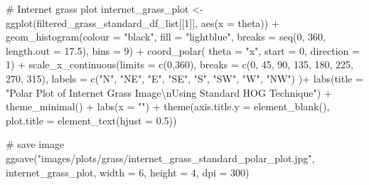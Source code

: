 \documentclass[
  letterpaper,
  DIV=11,
  numbers=noendperiod]{scrreprt}
\newenvironment{Shaded}{\begin{snugshade}}{\end{snugshade}}
\newcommand{\AttributeTok}[1]{\textcolor[rgb]{0.40,0.45,0.13}{#1}}
\newcommand{\CommentTok}[1]{\textcolor[rgb]{0.37,0.37,0.37}{#1}}
\newcommand{\DecValTok}[1]{\textcolor[rgb]{0.68,0.00,0.00}{#1}}
\newcommand{\FloatTok}[1]{\textcolor[rgb]{0.68,0.00,0.00}{#1}}
\newcommand{\FunctionTok}[1]{\textcolor[rgb]{0.28,0.35,0.67}{#1}}
\newcommand{\NormalTok}[1]{\textcolor[rgb]{0.00,0.23,0.31}{#1}}
\newcommand{\OtherTok}[1]{\textcolor[rgb]{0.00,0.23,0.31}{#1}}
\newcommand{\SpecialCharTok}[1]{\textcolor[rgb]{0.37,0.37,0.37}{#1}}
\newcommand{\StringTok}[1]{\textcolor[rgb]{0.13,0.47,0.30}{#1}}
\begin{document}
\begin{Shaded}
\begin{Highlighting}[]
\CommentTok{\# Internet grass plot}
\NormalTok{internet\_grass\_plot }\OtherTok{\textless{}{-}}
  \FunctionTok{ggplot}\NormalTok{(filtered\_grass\_standard\_df\_list[[}\DecValTok{1}\NormalTok{]], }
         \FunctionTok{aes}\NormalTok{(}\AttributeTok{x =}\NormalTok{ theta)) }\SpecialCharTok{+}
  \FunctionTok{geom\_histogram}\NormalTok{(}\AttributeTok{colour =} \StringTok{"black"}\NormalTok{, }
                 \AttributeTok{fill =} \StringTok{"lightblue"}\NormalTok{, }
                 \AttributeTok{breaks =} \FunctionTok{seq}\NormalTok{(}\DecValTok{0}\NormalTok{, }\DecValTok{360}\NormalTok{, }\AttributeTok{length.out =} \FloatTok{17.5}\NormalTok{),}
                 \AttributeTok{bins =} \DecValTok{9}\NormalTok{) }\SpecialCharTok{+}
  \FunctionTok{coord\_polar}\NormalTok{(}
    \AttributeTok{theta =} \StringTok{"x"}\NormalTok{, }
    \AttributeTok{start =} \DecValTok{0}\NormalTok{, }
    \AttributeTok{direction =} \DecValTok{1}\NormalTok{) }\SpecialCharTok{+}
  \FunctionTok{scale\_x\_continuous}\NormalTok{(}\AttributeTok{limits =} \FunctionTok{c}\NormalTok{(}\DecValTok{0}\NormalTok{,}\DecValTok{360}\NormalTok{),}
    \AttributeTok{breaks =} \FunctionTok{c}\NormalTok{(}\DecValTok{0}\NormalTok{, }\DecValTok{45}\NormalTok{, }\DecValTok{90}\NormalTok{, }\DecValTok{135}\NormalTok{, }\DecValTok{180}\NormalTok{, }\DecValTok{225}\NormalTok{, }\DecValTok{270}\NormalTok{, }\DecValTok{315}\NormalTok{), }
    \AttributeTok{labels =} \FunctionTok{c}\NormalTok{(}\StringTok{"N"}\NormalTok{, }\StringTok{"NE"}\NormalTok{, }\StringTok{"E"}\NormalTok{, }\StringTok{"SE"}\NormalTok{, }\StringTok{"S"}\NormalTok{, }\StringTok{"SW"}\NormalTok{, }\StringTok{"W"}\NormalTok{, }\StringTok{"NW"}\NormalTok{)}
\NormalTok{  )}\SpecialCharTok{+}
  \FunctionTok{labs}\NormalTok{(}\AttributeTok{title =} \StringTok{"Polar Plot of Internet Grass Image}\SpecialCharTok{\textbackslash{}n}\StringTok{Using Standard HOG Technique"}\NormalTok{) }\SpecialCharTok{+}
  \FunctionTok{theme\_minimal}\NormalTok{() }\SpecialCharTok{+}
  \FunctionTok{labs}\NormalTok{(}\AttributeTok{x =} \StringTok{""}\NormalTok{) }\SpecialCharTok{+}
  \FunctionTok{theme}\NormalTok{(}\AttributeTok{axis.title.y =} \FunctionTok{element\_blank}\NormalTok{(),}
        \AttributeTok{plot.title =} \FunctionTok{element\_text}\NormalTok{(}\AttributeTok{hjust =} \FloatTok{0.5}\NormalTok{))}

\CommentTok{\# save image}
\FunctionTok{ggsave}\NormalTok{(}\StringTok{"images/plots/grass/internet\_grass\_standard\_polar\_plot.jpg"}\NormalTok{, internet\_grass\_plot, }\AttributeTok{width =} \DecValTok{6}\NormalTok{, }\AttributeTok{height =} \DecValTok{4}\NormalTok{, }\AttributeTok{dpi =} \DecValTok{300}\NormalTok{)}
\end{Highlighting}
\end{Shaded}
\end{document}

